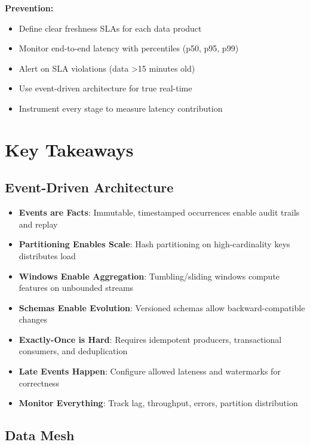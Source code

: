 \textbf{Prevention:}
\begin{itemize}
    \item Define clear freshness SLAs for each data product
    \item Monitor end-to-end latency with percentiles (p50, p95, p99)
    \item Alert on SLA violations (data >15 minutes old)
    \item Use event-driven architecture for true real-time
    \item Instrument every stage to measure latency contribution
\end{itemize}

\section{Key Takeaways}

\subsection{Event-Driven Architecture}

\begin{itemize}
    \item \textbf{Events are Facts}: Immutable, timestamped occurrences enable audit trails and replay
    \item \textbf{Partitioning Enables Scale}: Hash partitioning on high-cardinality keys distributes load
    \item \textbf{Windows Enable Aggregation}: Tumbling/sliding windows compute features on unbounded streams
    \item \textbf{Schemas Enable Evolution}: Versioned schemas allow backward-compatible changes
    \item \textbf{Exactly-Once is Hard}: Requires idempotent producers, transactional consumers, and deduplication
    \item \textbf{Late Events Happen}: Configure allowed lateness and watermarks for correctness
    \item \textbf{Monitor Everything}: Track lag, throughput, errors, partition distribution
\end{itemize}

\subsection{Data Mesh}

